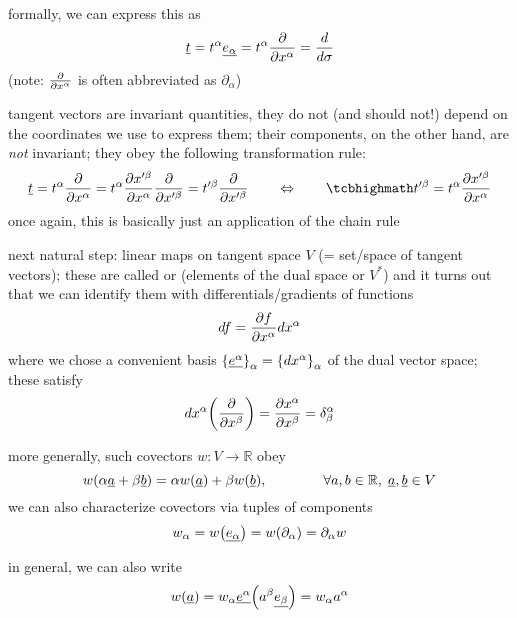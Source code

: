 \documentclass[ART_main.tex]{subfiles}
\begin{document}
formally, we can express this as
\begin{equation}
\underline{t} = t^\alpha \underline{e_\alpha} = t^\alpha \pdv{x^\alpha} = \dv{\sigma}
\end{equation}
(note: $\pdv{x^\alpha}$ is often abbreviated as $\partial_\alpha$)


tangent vectors are invariant quantities, they do not (and should not!) depend on the coordinates we use to express them; their components, on the other hand, are \emph{not} invariant; they obey the following transformation rule:
\begin{equation}\label{eq:vec_trafo}
\underline{t} = t^\alpha \pdv{x^\alpha} = t^\alpha \pdv{x'^\beta}{x^\alpha} \pdv{x'^\beta} = t'^\beta \pdv{x'^\beta}
\qquad \Leftrightarrow \qquad
\eqbox{
t'^\beta = t^\alpha \pdv{x'^\beta}{x^\alpha}
}
\end{equation}
once again, this is basically just an application of the chain rule


next natural step: linear maps on tangent space $V$ (= set/space of tangent vectors); these are called  or  (elements of the dual space or  $V^*$) and it turns out that we can identify them with differentials/gradients of functions
\begin{equation}
df = \pdv{f}{x^\alpha} dx^\alpha
\end{equation}
where we chose a convenient basis $\qty{\underline{e^\alpha}}_\alpha = \qty{dx^\alpha}_\alpha$ of the dual vector space; these satisfy
\begin{equation}
dx^\alpha\qty(\pdv{x^\beta}) = \pdv{x^\alpha}{x^\beta} = \delta^\alpha_\beta
\end{equation}

more generally, such covectors $w: V \rightarrow \mathbb{R}$ obey
\begin{equation}
w\qty(\alpha \underline{a} + \beta \underline{b}) = \alpha w\qty(\underline{a}) + \beta w\qty(\underline{b}), \qquad \qquad \forall a, b \in \mathbb{R}, \; \underline{a}, \underline{b} \in V
\end{equation}
we can also characterize covectors via tuples of components
\begin{equation}
w_\alpha = w\qty(\underline{e_\alpha}) = w\qty(\partial_\alpha) = \partial_\alpha w
\end{equation}

in general, we can also write
\begin{equation}
w\qty(\underline{a}) = w_\alpha \underline{e^\alpha}\qty(a^\beta \underline{e_\beta}) = w_\alpha a^\alpha
\end{equation}
\end{document}
